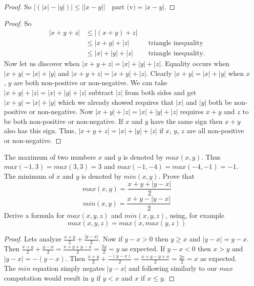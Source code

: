 \begin{proof}
    So $|(|x| - |y|)| \le ||x - y|| \quad \text{part (v)} = |x - y|$.
\end{proof}

\begin{proof}
    So
    \begin{align*}
        |x + y + z| &\le |(x + y) + z| && \\
        &\le |x + y| + |z| && \text{triangle inequality} \\
        &\le |x| + |y| + |z| && \text{triangle inequality}.
    \end{align*}
    Now let us discover when $|x + y + z| = |x| + |y| + |z|$.
    Equality occurs when $|x + y| = |x| + |y|$ and 
        $|x + y + z| = |x + y| + |z|$.
    Clearly $|x + y| = |x| + |y|$ when $x$, $y$ are both non-positive or non-negative.
    We can take $|x + y| + |z| = |x| + |y| + |z|$ subtract 
        $|z|$ from both sides and get $|x + y| = |x| + |y|$ 
        which we already showed requires that $|x|$ and $|y|$ 
        both be non-positive or non-negative.
    Now $|x + y| + |z| = |x| + |y| + |z|$ requires 
        $x + y$ and $z$ to be both non-positive or non-negative.
    If $x$ and $y$ have the same sign then $x + y$ also has this sign.
    Thus, $|x + y + z|= |x| + |y| + |z|$ 
        if $x$, $y$, $z$ are all non-positive or non-negative.
\end{proof}

\begin{tcolorbox}[title=Problem 13, breakable]
    The maximum of two numbers $x$ and $y$ is denoted by 
    $max(x, y)$. Thus $max(-1, 3) = max(3, 3) = 3$
    and $max(-1, -4) = max(-4, -1) = -1$.
    The minimum of $x$ and $y$ is denoted by $min(x, y)$. Prove that
    \[max(x, y) = \frac{x + y + |y - x|}{2}\]
    \[min(x, y) = \frac{x + y - |y - x|}{2}\]
    Derive a formula for $max(x, y, z)$ and $min(x, y, z)$, using, for example
    \[max(x, y, z) = max(x, max(y, z))\]
\end{tcolorbox}

\begin{proof}
    Lets analyze $\frac{x + y}{2} + \frac{|y - x|}{2}$.
    Now if $y - x > 0$ then $y \ge x$ and $|y - x| = y - x$.
    Then $\frac{x + y}{2} + \frac{y - x}{2}
        =\frac{x + y + y - x}{2} = \frac{2y}{2} = y$
        as expected.
    If $y - x < 0$ then $x > y$ and $|y - x| = -(y - x)$.
    Then $\frac{x + y}{2} + \frac{-(y - x)}{2}
        =\frac{x + y - y + x}{2} = \frac{2x}{2} = x$
        as expected.
    The $min$ equation simply negates $|y - x|$
        and following similarly to our $max$ 
        computation would result in 
        $y$ if $y < x$ and $x$ if $x \le y$.
\end{proof}

